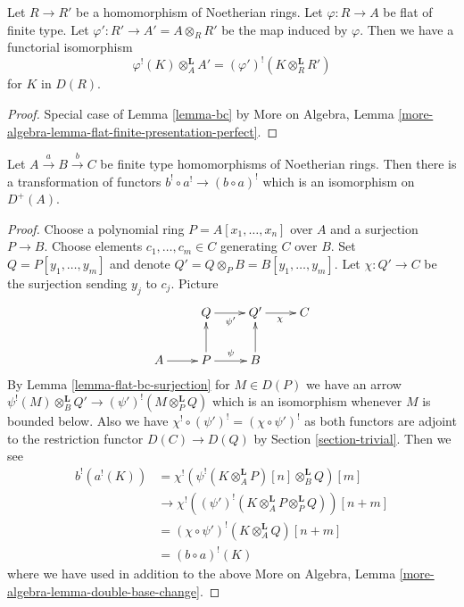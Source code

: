 \begin{lemma}
\label{lemma-bc-flat}
Let $R \to R'$ be a homomorphism of Noetherian rings.
Let $\varphi : R \to A$ be flat of finite type.
Let $\varphi' : R' \to A' = A \otimes_R R'$ be the map induced by $\varphi$.
Then we have a functorial isomorphism
$$
\varphi^!(K) \otimes_A^\mathbf{L} A' =
(\varphi')^!(K \otimes_R^\mathbf{L} R')
$$
for $K$ in $D(R)$.
\end{lemma}

\begin{proof}
Special case of Lemma \ref{lemma-bc} by
More on Algebra, Lemma
\ref{more-algebra-lemma-flat-finite-presentation-perfect}.
\end{proof}

\begin{lemma}
\label{lemma-composition-shriek-algebraic}
Let $A \xrightarrow{a} B \xrightarrow{b} C$ be finite type homomorphisms of
Noetherian rings. Then there is a transformation of functors
$b^! \circ a^! \to (b \circ a)^!$ which is an isomorphism on $D^+(A)$.
\end{lemma}

\begin{proof}
Choose a polynomial ring $P = A[x_1, \ldots, x_n]$ over $A$
and a surjection $P \to B$. Choose elements $c_1, \ldots, c_m \in C$
generating $C$ over $B$. Set $Q = P[y_1, \ldots, y_m]$ and
denote $Q' = Q \otimes_P B = B[y_1, \ldots, y_m]$.
Let $\chi : Q' \to C$ be the surjection sending $y_j$ to $c_j$.
Picture
$$
\xymatrix{
& Q \ar[r]_{\psi'} & Q' \ar[r]_\chi & C \\
A \ar[r] & P \ar[r]^\psi \ar[u] & B \ar[u]
}
$$
By Lemma \ref{lemma-flat-bc-surjection} for $M \in D(P)$ we have an arrow
$\psi^!(M) \otimes_B^\mathbf{L} Q' \to (\psi')^!(M \otimes_P^\mathbf{L} Q)$
which is an isomorphism whenever $M$ is bounded below. Also
we have $\chi^! \circ (\psi')^! = (\chi \circ \psi')^!$ as both
functors are adjoint to the restriction functor $D(C) \to D(Q)$
by Section \ref{section-trivial}. Then we see
\begin{align*}
b^!(a^!(K))
& =
\chi^!(\psi^!(K \otimes_A^\mathbf{L} P)[n] \otimes_B^\mathbf{L} Q)[m] \\
& \to
\chi^!((\psi')^!(K \otimes_A^\mathbf{L} P \otimes_P^\mathbf{L} Q))[n + m] \\
& =
(\chi \circ \psi')^!(K\otimes_A^\mathbf{L} Q)[n + m] \\
& =
(b \circ a)^!(K)
\end{align*}
where we have used in addition to the above
More on Algebra, Lemma \ref{more-algebra-lemma-double-base-change}.
\end{proof}

